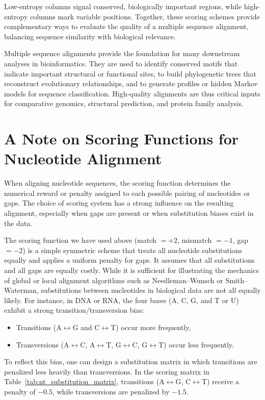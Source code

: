 Low-entropy columns signal conserved, biologically important regions, while high-entropy columns mark variable positions. Together, these scoring schemes provide complementary ways to evaluate the quality of a multiple sequence alignment, balancing sequence similarity with biological relevance.

Multiple sequence alignments provide the foundation for many downstream analyses in bioinformatics. They are used to identify conserved motifs that indicate important structural or functional sites, to build phylogenetic trees that reconstruct evolutionary relationships, and to generate profiles or hidden Markov models for sequence classification. High-quality alignments are thus critical inputs for comparative genomics, structural prediction, and protein family analysis.

\section{A Note on Scoring Functions for Nucleotide Alignment}

When aligning nucleotide sequences, the scoring function determines the numerical reward or penalty assigned to each possible pairing of nucleotides or gaps. The choice of scoring system has a strong influence on the resulting alignment, especially when gaps are present or when substitution biases exist in the data.

The scoring function we have used above (match $= +2$, mismatch $= -1$, gap $= -2$) is a simple symmetric scheme that treats all nucleotide substitutions equally and applies a uniform penalty for gaps. It assumes that all substitutions and all gaps are equally costly. While it is sufficient for illustrating the mechanics of global or local alignment algorithms such as Needleman–Wunsch or Smith–Waterman, substitutions between nucleotides in biological data are not all equally likely.  For instance, in DNA or RNA, the four bases (A, C, G, and T or U) exhibit a strong transition/transversion bias:

\begin{itemize}
    \item Transitions (A$\leftrightarrow$G and C$\leftrightarrow$T) occur more frequently,
    \item Transversions (A$\leftrightarrow$C, A$\leftrightarrow$T, G$\leftrightarrow$C, G$\leftrightarrow$T) occur less frequently.
\end{itemize}

To reflect this bias, one can design a substitution matrix in which transitions are penalized less heavily than transversions. In the scoring matrix in Table~\ref{tab:nt_substitution_matrix}, transitions (A$\leftrightarrow$G, C$\leftrightarrow$T) receive a penalty of $-0.5$, while transversions are penalized by $-1.5$.

